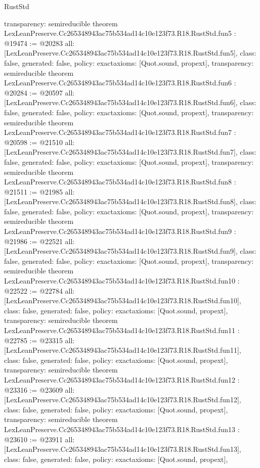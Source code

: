 \begin{lexlean}{RustStd}
\begin{coremodule}
{  transparency: semireducible
}
theorem LexLeanPreserve.Cc265348943ac75b534ad14c10e123f73.R18.RustStd.fun5 : @19474 := @20283 {
  all: [LexLeanPreserve.Cc265348943ac75b534ad14c10e123f73.R18.RustStd.fun5],
  class: false,
  generated: false,
  policy: exact{axioms: [Quot.sound, propext]},
  transparency: semireducible
}
theorem LexLeanPreserve.Cc265348943ac75b534ad14c10e123f73.R18.RustStd.fun6 : @20284 := @20597 {
  all: [LexLeanPreserve.Cc265348943ac75b534ad14c10e123f73.R18.RustStd.fun6],
  class: false,
  generated: false,
  policy: exact{axioms: [Quot.sound, propext]},
  transparency: semireducible
}
theorem LexLeanPreserve.Cc265348943ac75b534ad14c10e123f73.R18.RustStd.fun7 : @20598 := @21510 {
  all: [LexLeanPreserve.Cc265348943ac75b534ad14c10e123f73.R18.RustStd.fun7],
  class: false,
  generated: false,
  policy: exact{axioms: [Quot.sound, propext]},
  transparency: semireducible
}
theorem LexLeanPreserve.Cc265348943ac75b534ad14c10e123f73.R18.RustStd.fun8 : @21511 := @21985 {
  all: [LexLeanPreserve.Cc265348943ac75b534ad14c10e123f73.R18.RustStd.fun8],
  class: false,
  generated: false,
  policy: exact{axioms: [Quot.sound, propext]},
  transparency: semireducible
}
theorem LexLeanPreserve.Cc265348943ac75b534ad14c10e123f73.R18.RustStd.fun9 : @21986 := @22521 {
  all: [LexLeanPreserve.Cc265348943ac75b534ad14c10e123f73.R18.RustStd.fun9],
  class: false,
  generated: false,
  policy: exact{axioms: [Quot.sound, propext]},
  transparency: semireducible
}
theorem LexLeanPreserve.Cc265348943ac75b534ad14c10e123f73.R18.RustStd.fun10 : @22522 := @22784 {
  all: [LexLeanPreserve.Cc265348943ac75b534ad14c10e123f73.R18.RustStd.fun10],
  class: false,
  generated: false,
  policy: exact{axioms: [Quot.sound, propext]},
  transparency: semireducible
}
theorem LexLeanPreserve.Cc265348943ac75b534ad14c10e123f73.R18.RustStd.fun11 : @22785 := @23315 {
  all: [LexLeanPreserve.Cc265348943ac75b534ad14c10e123f73.R18.RustStd.fun11],
  class: false,
  generated: false,
  policy: exact{axioms: [Quot.sound, propext]},
  transparency: semireducible
}
theorem LexLeanPreserve.Cc265348943ac75b534ad14c10e123f73.R18.RustStd.fun12 : @23316 := @23609 {
  all: [LexLeanPreserve.Cc265348943ac75b534ad14c10e123f73.R18.RustStd.fun12],
  class: false,
  generated: false,
  policy: exact{axioms: [Quot.sound, propext]},
  transparency: semireducible
}
theorem LexLeanPreserve.Cc265348943ac75b534ad14c10e123f73.R18.RustStd.fun13 : @23610 := @23911 {
  all: [LexLeanPreserve.Cc265348943ac75b534ad14c10e123f73.R18.RustStd.fun13],
  class: false,
  generated: false,
  policy: exact{axioms: [Quot.sound, propext]},
}
\end{coremodule}
\end{lexlean}

